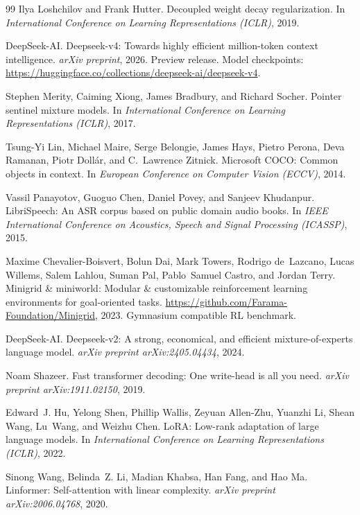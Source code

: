 \begin{thebibliography}{99}
Ilya Loshchilov and Frank Hutter.
\newblock Decoupled weight decay regularization.
\newblock In \emph{International Conference on Learning Representations (ICLR)}, 2019.

DeepSeek-AI.
\newblock Deepseek-v4: Towards highly efficient million-token context intelligence.
\newblock \emph{arXiv preprint}, 2026.
\newblock Preview release. Model checkpoints: \url{https://huggingface.co/collections/deepseek-ai/deepseek-v4}.

Stephen Merity, Caiming Xiong, James Bradbury, and Richard Socher.
\newblock Pointer sentinel mixture models.
\newblock In \emph{International Conference on Learning Representations (ICLR)}, 2017.

Tsung-Yi Lin, Michael Maire, Serge Belongie, James Hays, Pietro Perona, Deva Ramanan, Piotr
  Doll\'{a}r, and C.~Lawrence Zitnick.
\newblock Microsoft COCO: Common objects in context.
\newblock In \emph{European Conference on Computer Vision (ECCV)}, 2014.

Vassil Panayotov, Guoguo Chen, Daniel Povey, and Sanjeev Khudanpur.
\newblock LibriSpeech: An ASR corpus based on public domain audio books.
\newblock In \emph{IEEE International Conference on Acoustics, Speech and Signal Processing (ICASSP)}, 2015.

Maxime Chevalier-Boisvert, Bolun Dai, Mark Towers, Rodrigo de~Lazcano, Lucas Willems, Salem
  Lahlou, Suman Pal, Pablo~Samuel Castro, and Jordan Terry.
\newblock Minigrid \& miniworld: Modular \& customizable reinforcement learning environments for
  goal-oriented tasks.
\newblock \url{https://github.com/Farama-Foundation/Minigrid}, 2023.
\newblock Gymnasium compatible RL benchmark.

DeepSeek-AI.
\newblock Deepseek-v2: A strong, economical, and efficient mixture-of-experts language model.
\newblock \emph{arXiv preprint arXiv:2405.04434}, 2024.

Noam Shazeer.
\newblock Fast transformer decoding: One write-head is all you need.
\newblock \emph{arXiv preprint arXiv:1911.02150}, 2019.

Edward~J. Hu, Yelong Shen, Phillip Wallis, Zeyuan Allen-Zhu, Yuanzhi Li, Shean Wang, Lu~Wang,
  and Weizhu Chen.
\newblock LoRA: Low-rank adaptation of large language models.
\newblock In \emph{International Conference on Learning Representations (ICLR)}, 2022.

Sinong Wang, Belinda~Z. Li, Madian Khabsa, Han Fang, and Hao Ma.
\newblock Linformer: Self-attention with linear complexity.
\newblock \emph{arXiv preprint arXiv:2006.04768}, 2020.


\end{thebibliography}
